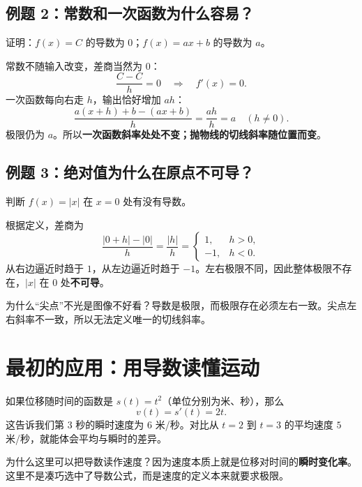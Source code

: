 \documentclass[12pt,a4paper,UTF8,fontset=none]{ctexart}
\begin{document}
\subsection{例题 2：常数和一次函数为什么容易？}
\begin{questionbox}[章节例题 2]
证明：$f(x)=C$ 的导数为 $0$；$f(x)=ax+b$ 的导数为 $a$。
\end{questionbox}

常数不随输入改变，差商当然为 $0$：
\[
\frac{C-C}{h}=0\quad\Longrightarrow\quad f'(x)=0.
\]
一次函数每向右走 $h$，输出恰好增加 $ah$：
\[
\frac{a(x+h)+b-(ax+b)}h=\frac{ah}{h}=a\quad(h\ne0).
\]
极限仍为 $a$。所以\textbf{一次函数斜率处处不变；抛物线的切线斜率随位置而变}。\proofdone

\subsection{例题 3：绝对值为什么在原点不可导？}
\begin{questionbox}[章节例题 3]
判断 $f(x)=|x|$ 在 $x=0$ 处有没有导数。
\end{questionbox}

根据定义，差商为
\[
\frac{|0+h|-|0|}{h}=\frac{|h|}{h}=
\begin{cases}1,&h>0,\\-1,&h<0.\end{cases}
\]
从右边逼近时趋于 $1$，从左边逼近时趋于 $-1$。左右极限不同，因此整体极限不存在，$|x|$ 在 $0$ 处\textbf{不可导}。\proofdone

\begin{takeawaybox}
为什么“尖点”不光是图像不好看？导数是极限，而极限存在必须左右一致。尖点左右斜率不一致，所以无法定义唯一的切线斜率。
\end{takeawaybox}

\section{最初的应用：用导数读懂运动}
如果位移随时间的函数是 $s(t)=t^2$（单位分别为米、秒），那么
\[
v(t)=s'(t)=2t.
\]
这告诉我们第 $3$ 秒的瞬时速度为 $6$ 米/秒。对比从 $t=2$ 到 $t=3$ 的平均速度 $5$ 米/秒，就能体会平均与瞬时的差异。

\begin{whybox}
为什么这里可以把导数读作速度？因为速度本质上就是位移对时间的\textbf{瞬时变化率}。这里不是凑巧选中了导数公式，而是速度的定义本来就要求极限。
\end{whybox}
\end{document}
